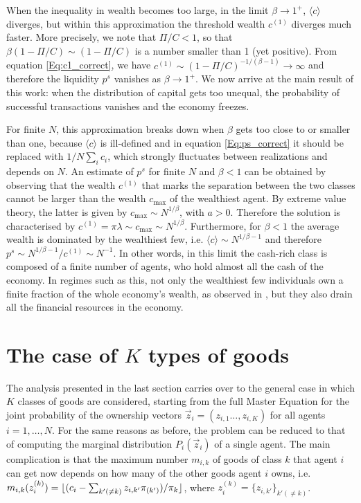 When the inequality in wealth becomes too large, in the limit $\beta \to 1^+$, $\langle c \rangle$ diverges, but within this approximation the threshold wealth $c^{(1)}$ diverges much faster. More precisely, we note that $\Pi/C<1$, so that $\beta ( 1- \Pi/C) \sim (1-\Pi/C)$ is a number smaller than 1 (yet positive). From equation \eqref{Eq:c1_correct}, we have $c^{(1)}\sim (1-\Pi/C)^{-1/(\beta-1)} \to \infty$ and therefore the liquidity $p^s$ vanishes as $\beta \to 1^+$. We now arrive at the main result of this work: when the distribution of capital gets too unequal, the probability of successful transactions vanishes and the economy freezes.

For finite $N$, this approximation breaks down when $\beta$ gets too close to or smaller than one, because $\langle c \rangle$ is ill-defined and in equation \eqref{Eq:ps_correct} it should be replaced with $1/N \sum_i c_i $, which strongly fluctuates between realizations and depends on $N$. An estimate of $p^s$ for finite $N$ and $\beta<1$ can be obtained by observing that the wealth $c^{(1)}$ that marks the separation between the two classes cannot be larger than the wealth $c_{\max}$ of the wealthiest agent. By extreme value theory, the latter is given by $c_{\max}\sim N^{1/\beta}$, with $a>0$. Therefore the solution is characterised by $ c^{(1)}=\pi \lambda\sim c_{\max}\sim N^{1/\beta}$. Furthermore, for $\beta<1$ the average wealth is dominated by the wealthiest few, i.e. $\langle c \rangle \sim N^{1/\beta-1}$ and therefore  $p^s \sim N^{1/\beta-1}/c^{(1)} \sim N^{-1}$. In other words, in this limit the cash-rich class is composed of a finite number of agents, who hold almost all the cash of the economy. In regimes such as this, not only the wealthiest few individuals own a finite fraction of the whole economy's wealth, as observed in \cite{bouchaud2000wealth}, but they also drain all the financial resources in the economy.


\section{The case of $K$ types of goods}

The analysis presented in the last section carries over to the general case in which $K$ classes of goods are considered, starting from the full Master Equation for the joint probability of the ownership vectors $\vec z_i=(z_{i,1}\ldots, z_{i,K})$ for all agents $i=1,\ldots,N$. For the same reasons as before, the problem can be reduced to that of computing the marginal distribution $P_i(\vec z_i)$ of a single agent. The main complication is that the maximum number $m_{i,k}$ of goods of class $k$ that agent $i$ can get now depends on how many of the other goods agent $i$ owns, i.e. $m_{i,k}(z^{(k)}_i)=\lfloor(c_i-\sum_{k'(\neq k)} z_{i,k'} \pi_{(k')})/\pi_{{k}}\rfloor$, where $z^{(k)}_i=\{z_{i,{k'}}\}_{k'(\neq k)}$. 

